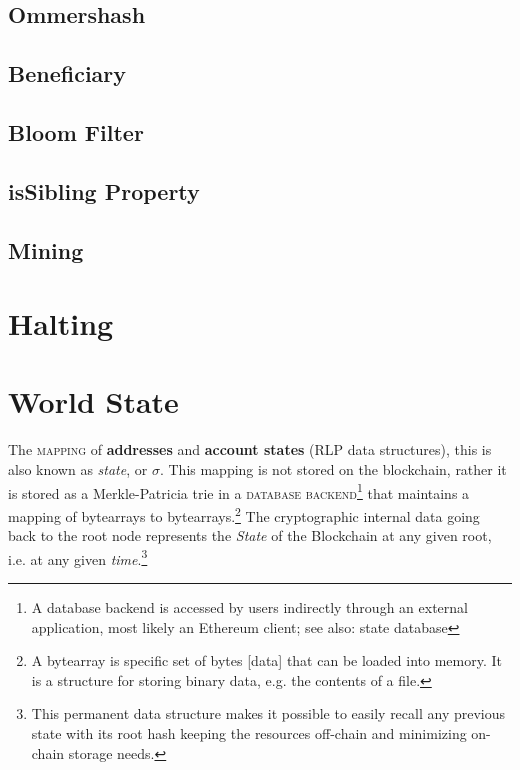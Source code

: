 \documentclass[11pt,a4paper,leqno,bibliography=totoc]{scrartcl}
\newenvironment{alphafootnotes}
    {\par\edef\savedfootnotenumber{\number\value{footnote}}
    \renewcommand{\thefootnote}{\alph{footnote}}
     \setcounter{footnote}{0}}
    {\par\setcounter{footnote}{\savedfootnotenumber}}
\begin{document}
\begin{alphafootnotes}
\begin{multicols}{2}
    \subsection{Ommershash}

    \subsection{Beneficiary}

    \subsection{Bloom Filter}

    \subsection{isSibling Property}

    \subsection{Mining}


    \section{Halting}
  \section{World State}



    The \textsc{mapping} of \textbf{addresses} and \textbf{account states} (RLP data structures), this is also known as \textit{state}, or $\sigma$. This mapping is not stored on the blockchain, rather it is stored as a Merkle-Patricia \gls{trie} in a \textsc{database backend}\footnote{A database backend is accessed by users indirectly through an external application, most likely an Ethereum client; see also: \gls{state database}} that maintains a mapping of bytearrays to bytearrays.\footnote{A bytearray is specific set of bytes [data] that can be loaded into memory. It is a structure for storing binary data, e.g. the contents of a file.} The cryptographic internal data going back to the \gls{root node} represents the \textit{State} of the Blockchain at any given root, i.e. at any given \textit{time}.\footnote{This permanent data structure makes it possible to easily recall any previous state with its root hash keeping the resources off-chain and minimizing on-chain storage needs.}







\end{multicols}
\end{alphafootnotes}
\end{document}
